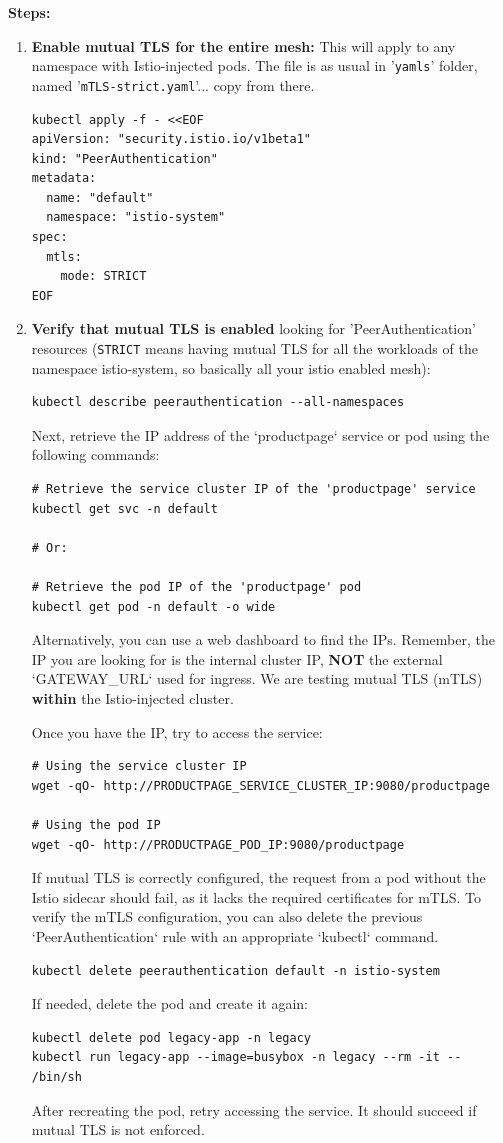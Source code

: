 \documentclass{article}
\begin{document}
\textbf{Steps:}
\begin{enumerate}
    \item \textbf{Enable mutual TLS for the entire mesh:}
    This will apply to any namespace with Istio-injected pods. The file is as usual in '\texttt{yamls}' folder, named '\texttt{mTLS-strict.yaml}'... copy from there.
    \begin{lstlisting}
kubectl apply -f - <<EOF
apiVersion: "security.istio.io/v1beta1"
kind: "PeerAuthentication"
metadata:
  name: "default"
  namespace: "istio-system"
spec:
  mtls:
    mode: STRICT
EOF    
\end{lstlisting}

\item \textbf{Verify that mutual TLS is enabled} looking for 'PeerAuthentication' resources (\texttt{STRICT} means having mutual TLS for all the workloads of the namespace istio-system, so basically all your istio enabled mesh):
\begin{lstlisting}
kubectl describe peerauthentication --all-namespaces
\end{lstlisting}

Next, retrieve the IP address of the `productpage` service or pod using the following commands:

\begin{lstlisting}
# Retrieve the service cluster IP of the 'productpage' service
kubectl get svc -n default

# Or:

# Retrieve the pod IP of the 'productpage' pod
kubectl get pod -n default -o wide
\end{lstlisting}

Alternatively, you can use a web dashboard to find the IPs. Remember, the IP you are looking for is the internal cluster IP, \textbf{NOT} the external `GATEWAY\_URL` used for ingress. We are testing mutual TLS (mTLS) \textbf{within} the Istio-injected cluster.

Once you have the IP, try to access the service:

\begin{lstlisting}
# Using the service cluster IP
wget -qO- http://PRODUCTPAGE_SERVICE_CLUSTER_IP:9080/productpage

# Using the pod IP
wget -qO- http://PRODUCTPAGE_POD_IP:9080/productpage
\end{lstlisting}

If mutual TLS is correctly configured, the request from a pod without the Istio sidecar should fail, as it lacks the required certificates for mTLS. To verify the mTLS configuration, you can also delete the previous `PeerAuthentication` rule with an appropriate `kubectl` command.
\begin{lstlisting}
kubectl delete peerauthentication default -n istio-system
    \end{lstlisting}
    If needed, delete the pod and create it again:
    \begin{lstlisting}
kubectl delete pod legacy-app -n legacy
kubectl run legacy-app --image=busybox -n legacy --rm -it -- /bin/sh
    \end{lstlisting}
    After recreating the pod, retry accessing the service. It should succeed if mutual TLS is not enforced.


\end{enumerate}
\end{document}
